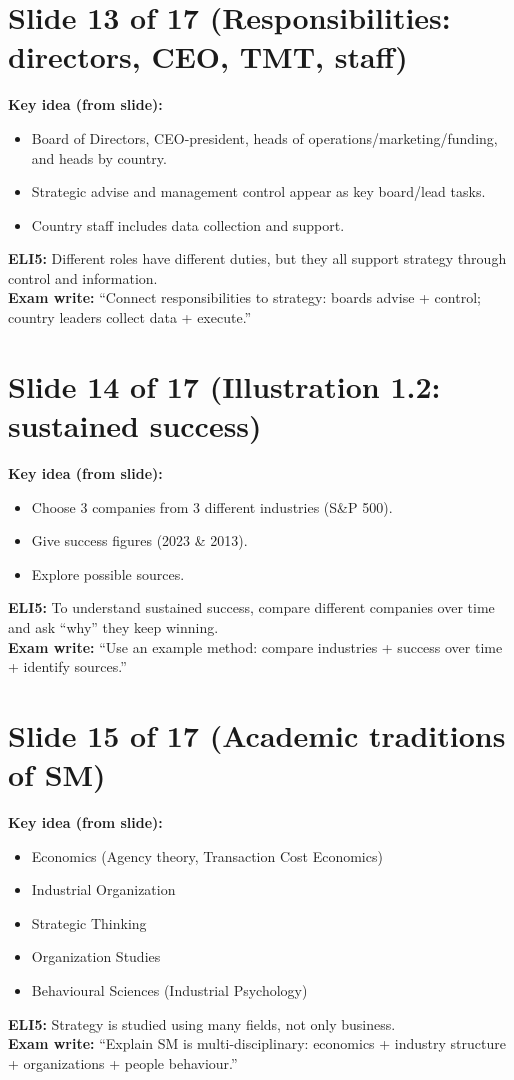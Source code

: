 \documentclass[11pt,a4paper]{article}
\begin{document}
\section*{Slide 13 of 17 (Responsibilities: directors, CEO, TMT, staff)}
\textbf{Key idea (from slide):}
\begin{itemize}
  \item Board of Directors, CEO-president, heads of operations/marketing/funding, and heads by country.
  \item Strategic advise and management control appear as key board/lead tasks.
  \item Country staff includes data collection and support.
\end{itemize}
\textbf{ELI5:} Different roles have different duties, but they all support strategy through control and information.\\
\textbf{Exam write:} ``Connect responsibilities to strategy: boards advise + control; country leaders collect data + execute.''

\section*{Slide 14 of 17 (Illustration 1.2: sustained success)}
\textbf{Key idea (from slide):}
\begin{itemize}
  \item Choose 3 companies from 3 different industries (S\&P 500).
\item Give success figures (2023 \& 2013).
  \item Explore possible sources.
\end{itemize}
\textbf{ELI5:} To understand sustained success, compare different companies over time and ask ``why'' they keep winning.\\
\textbf{Exam write:} ``Use an example method: compare industries + success over time + identify sources.''

\section*{Slide 15 of 17 (Academic traditions of SM)}
\textbf{Key idea (from slide):}
\begin{itemize}
  \item Economics (Agency theory, Transaction Cost Economics)
  \item Industrial Organization
  \item Strategic Thinking
  \item Organization Studies
  \item Behavioural Sciences (Industrial Psychology)
\end{itemize}
\textbf{ELI5:} Strategy is studied using many fields, not only business.\\
\textbf{Exam write:} ``Explain SM is multi-disciplinary: economics + industry structure + organizations + people behaviour.''
\end{document}

